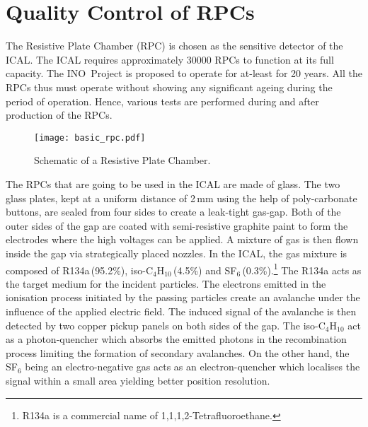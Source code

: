 
\chapter{Quality Control of RPCs}
The Resistive Plate Chamber (RPC) is chosen as the sensitive detector
of the ICAL. The ICAL requires approximately 30000 RPCs to function at
its full capacity. The INO~Project is proposed to operate for at-least
for 20 years. All the RPCs thus must operate without showing any
significant ageing during the period of operation. Hence, various
tests are performed during and after production of the RPCs.
\begin{figure}[h]
  \centering
  \texttt{[image: basic\_rpc.pdf]}
  \caption{Schematic of a Resistive Plate Chamber.}
  \label{fig:rpc}
\end{figure}

The RPCs that are going to be used in the ICAL are made of glass.
The two glass plates, kept at a uniform distance of 2\,mm using the
help of poly-carbonate buttons, are sealed from four sides to create
a leak-tight gas-gap. Both of the outer sides of the gap are coated
with semi-resistive graphite paint to form the electrodes where the
high voltages can be applied. A mixture of gas is then flown inside
the gap via strategically placed nozzles. In the ICAL, the gas
mixture is composed of R134a\,(95.2\%), iso-C$_4$H$_{10}$\,(4.5\%) and
SF$_6$\,(0.3\%).\footnote{R134a is a commercial name of
  1,1,1,2-Tetrafluoroethane.}
The R134a acts as the target medium for the incident particles.
The electrons emitted in the ionisation process initiated by the
passing particles create an avalanche under the influence of
the applied electric field. The induced signal of the avalanche is
then detected by two copper pickup panels on both sides of the gap.
The iso-C$_4$H$_{10}$ act as a photon-quencher which absorbs
the emitted photons in the recombination process limiting the
formation of secondary avalanches. On the other hand, the SF$_6$ being
an electro-negative gas acts as an electron-quencher which localises
the signal within a small area yielding better position resolution.

